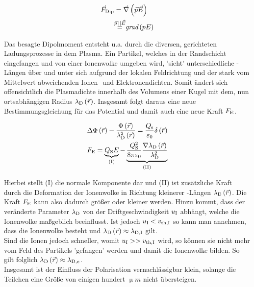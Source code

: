       \begin{align}
        \centering
        \vec{F}\ix{Dip}&=\vec{\nabla}\left(\vec{p}\vec{E}\right)\\
        &{\overset{\vec{p}\,||\vec{E}}{=}}\grad{pE} \nonumber
      \end{align}

    Das besagte Dipolmoment entsteht u.a. durch die diversen, gerichteten Ladungsprozesse in dem Plasma. Ein Partikel, welches in der Randschicht eingefangen und von einer Ionenwolke umgeben wird, 'sieht' unterschiedliche -Längen über und unter sich aufgrund der lokalen Feldrichtung und der stark vom Mittelwert abweichenden Ionen- und Elektronendichten. Somit ändert sich offensichtlich die Plasmadichte innerhalb des Volumens einer Kugel mit dem, nun ortsabhängigen Radius $\lambda_\text{D}\left(\vec{r}\right)$. Insgesamt folgt daraus eine neue Bestimmungsgleichung für das Potential und damit auch eine neue Kraft $F_\text{E}$.

      \begin{align}
        \Delta \Phi\left(\vec{r}\right)-\frac{\Phi\left(\vec{r}\right)}{\lambda_\text{D}^2\left(\vec{r}\right)}=\frac{Q_\text{s}}{\varepsilon_\text{0}}\delta\left(\vec{r}\right) \\
        F_\text{E}=\underbrace{Q_\text{S}E}_{\text{(I)}}-\underbrace{\frac{Q_\text{S}^2}{8\pi\varepsilon_\text{0}}\frac{\nabla\lambda_\text{D}\left(\vec{r}\right)}{\lambda_\text{D}^2}}_{\text{(II)}}
      \end{align}

    Hierbei stellt (I) die normale Komponente dar und (II) ist zusätzliche Kraft durch die Deformation der Ionenwolke in Richtung kleinerer -Längen $\lambda_\text{D}\left(\vec{r}\right)$. Die Kraft $F_\text{E}$ kann also dadurch größer oder kleiner werden. Hinzu kommt, dass der veränderte Parameter $\lambda_\text{D}$ von der Driftgeschwindigkeit $u_\text{I}$ abhängt, welche die Ionenwolke maßgeblich beeinflusst. Ist jedoch $u_\text{I}<v_\text{th,I}$ so kann man annehmen, dass die Ionenwolke besteht und $\lambda_\text{D}\left(\vec{r}\right)\approx\lambda_\text{D,I}$ gilt.\\
    Sind die Ionen jedoch schneller, womit $u_\text{I}>>v_\text{th,I}$ wird, so können sie nicht mehr vom Feld des Partikels 'gefangen' werden und damit die Ionenwolke bilden. So gilt folglich $\lambda_\text{D}\left(\vec{r}\right)\approx\lambda_\text{D,e}$.\\
    Insgesamt ist der Einfluss der Polarisation vernachlässigbar klein, solange die Teilchen eine Größe von einigen hundert $\unit{\upmu m}$ nicht übersteigen.

